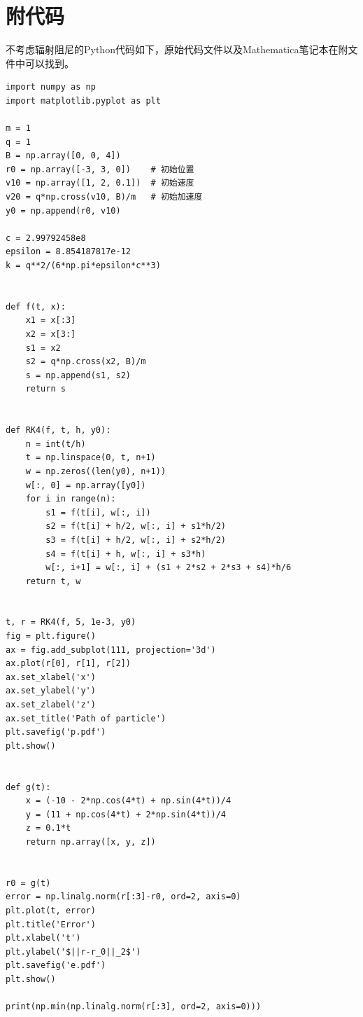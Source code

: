 \documentclass{article} %
\begin{document}
\section*{附代码}
不考虑辐射阻尼的Python代码如下，原始代码文件以及Mathematica笔记本在附文件中可以找到。
\begin{lstlisting}
import numpy as np
import matplotlib.pyplot as plt

m = 1
q = 1
B = np.array([0, 0, 4])
r0 = np.array([-3, 3, 0])    # 初始位置
v10 = np.array([1, 2, 0.1])  # 初始速度
v20 = q*np.cross(v10, B)/m   # 初始加速度
y0 = np.append(r0, v10)

c = 2.99792458e8
epsilon = 8.854187817e-12
k = q**2/(6*np.pi*epsilon*c**3)


def f(t, x):
    x1 = x[:3]
    x2 = x[3:]
    s1 = x2
    s2 = q*np.cross(x2, B)/m
    s = np.append(s1, s2)
    return s


def RK4(f, t, h, y0):
    n = int(t/h)
    t = np.linspace(0, t, n+1)
    w = np.zeros((len(y0), n+1))
    w[:, 0] = np.array([y0])
    for i in range(n):
        s1 = f(t[i], w[:, i])
        s2 = f(t[i] + h/2, w[:, i] + s1*h/2)
        s3 = f(t[i] + h/2, w[:, i] + s2*h/2)
        s4 = f(t[i] + h, w[:, i] + s3*h)
        w[:, i+1] = w[:, i] + (s1 + 2*s2 + 2*s3 + s4)*h/6
    return t, w


t, r = RK4(f, 5, 1e-3, y0)
fig = plt.figure()
ax = fig.add_subplot(111, projection='3d')
ax.plot(r[0], r[1], r[2])
ax.set_xlabel('x')
ax.set_ylabel('y')
ax.set_zlabel('z')
ax.set_title('Path of particle')
plt.savefig('p.pdf')
plt.show()


def g(t):
    x = (-10 - 2*np.cos(4*t) + np.sin(4*t))/4
    y = (11 + np.cos(4*t) + 2*np.sin(4*t))/4
    z = 0.1*t
    return np.array([x, y, z])


r0 = g(t)
error = np.linalg.norm(r[:3]-r0, ord=2, axis=0)
plt.plot(t, error)
plt.title('Error')
plt.xlabel('t')
plt.ylabel('$||r-r_0||_2$')
plt.savefig('e.pdf')
plt.show()

print(np.min(np.linalg.norm(r[:3], ord=2, axis=0)))
\end{lstlisting}
\end{document}

